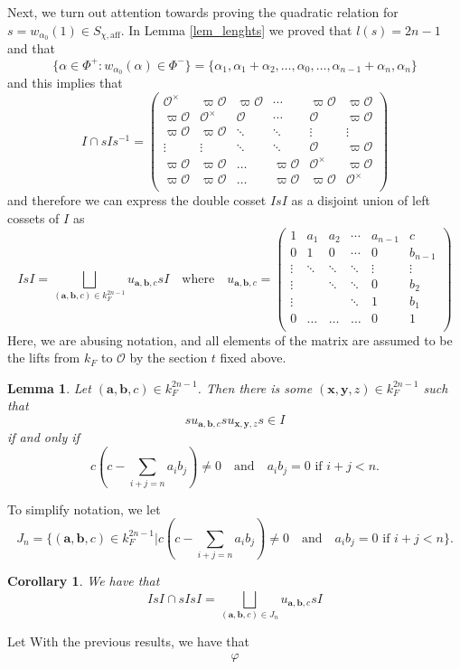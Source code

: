 \documentclass{article}
\newcommand{\aff}{\mathrm{aff}}
\newcommand{\cO}{\mathcal{O}}
\theoremstyle{plain}
\newtheorem{lemma}[theorem]{Lemma}
\newtheorem{cor}[theorem]{Corollary}
\theoremstyle{definition}
\begin{document}
    \newpage
    Next, we turn out attention towards proving the quadratic relation for $s=w_{\alpha_0}(1)\in S_{\chi,\aff}$. In Lemma \ref{lem_lenghts} we proved that $l(s)=2n-1$ and that 
    $$\{\alpha\in\Phi^+:w_{\alpha_0}(\alpha)\in\Phi^-\}=\{\alpha_1,\alpha_1+\alpha_2,\ldots,\alpha_0,\ldots,\alpha_{n-1}+\alpha_n,\alpha_n\}$$
    and this implies that
    \begin{equation*}
        I\cap sI s^{-1}=\begin{pmatrix}
            \cO^\times&\varpi\cO&\varpi\cO&\cdots&\varpi\cO&\varpi\cO\\
            \varpi\cO&\cO^\times&\cO&\cdots&\cO&\varpi\cO\\
            \varpi\cO&\varpi\cO&\ddots&\ddots&\vdots&\vdots\\
            \vdots&\vdots&\ddots&\ddots&\cO&\varpi\cO\\
            \varpi\cO&\varpi\cO&\ldots&\varpi\cO&\cO^\times&\varpi\cO\\
           \varpi\cO&\varpi\cO&\ldots&\varpi\cO&\varpi\cO&\cO^\times\\
        \end{pmatrix}
    \end{equation*}
    and therefore we can express the double cosset $IsI$ as a disjoint union of left cossets of $I$ as
    \begin{equation*}
        IsI=\bigsqcup_{(\mathbf{a},\mathbf{b},c)\in k_F^{2n-1}}u_{\mathbf{a},\mathbf{b},c}sI\quad\text{where}\quad u_{\mathbf{a},\mathbf{b},c}=\begin{pmatrix}
            1&a_1&a_2&\cdots&a_{n-1}&c\\
            0&1&0&\cdots&0&b_{n-1}\\
            \vdots&\ddots&\ddots&\ddots&\vdots&\vdots\\
            \vdots&&\ddots&\ddots&0&b_2\\
            \vdots&&&\ddots&1&b_1\\
            0&\ldots&\ldots&\ldots&0&1\\
        \end{pmatrix}
    \end{equation*}
    Here, we are abusing notation, and all elements of the matrix are assumed to be the lifts from $k_F$ to $\cO$ by the section $t$ fixed above.
    \begin{lemma}
        Let $(\mathbf{a},\mathbf{b},c)\in k_F^{2n-1}$. Then there is some $(\mathbf{x},\mathbf{y},z)\in k_F^{2n-1}$ such that 
        $$su_{\mathbf{a},\mathbf{b},c}su_{\mathbf{x},\mathbf{y},z}s\in I$$
        if and only if 
        \begin{equation*}
        c(c-\sum_{i+j=n}a_ib_j)\neq0\quad\text{and}\quad a_ib_j=0 \text{  if  } i+j<n.
        \end{equation*}
    \end{lemma}
    To simplify notation, we let $$J_n=\{(\mathbf{a},\mathbf{b},c)\in k_F^{2n-1}|c(c-\sum_{i+j=n}a_ib_j)\neq0\quad\text{and}\quad a_ib_j=0 \text{  if  } i+j<n\}.$$
    \begin{cor}
        We have that
        $$IsI\cap sIsI=\bigsqcup_{(\mathbf{a},\mathbf{b},c)\in J_n}u_{\mathbf{a},\mathbf{b},c}sI$$
    \end{cor}

    Let
    With the previous results, we have that
    \begin{align*}
        \varphi
    \end{align*}
\end{document}
